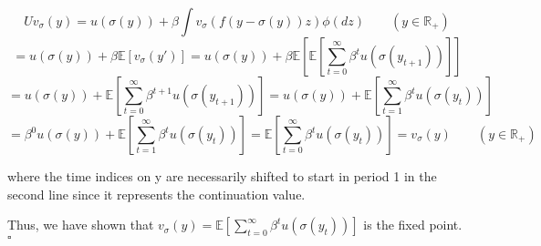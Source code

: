 \documentclass[letterpaper,12pt]{article}
\theoremstyle{definition}
\begin{document}
$$ Uv_{\sigma}(y) = u(\sigma(y)) + \beta \int v_{\sigma}(f(y - \sigma(y))z) \phi(dz) \qquad (y \in \mathbb R_+)$$
$$ = u(\sigma(y)) + \beta \mathbb{E} \left[ v_{\sigma}(y') \right]
= u(\sigma(y)) + \beta \mathbb{E} \left[ \mathbb E \left[ \sum_{t = 0}^{\infty} \beta^t u(\sigma(y_{t+1})) \right] \right]$$ 
$$ = u(\sigma(y)) + \mathbb E \left[ \sum_{t = 0}^{\infty} \beta^{t + 1} u(\sigma(y_{t+1})) \right] 
= u(\sigma(y)) + \mathbb E \left[ \sum_{t = 1}^{\infty} \beta^{t} u(\sigma(y_t)) \right] $$
$$ = \beta^0 u(\sigma(y)) + \mathbb E \left[ \sum_{t = 1}^{\infty} \beta^{t} u(\sigma(y_t)) \right] 
= \mathbb E \left[ \sum_{t = 0}^{\infty} \beta^t u(\sigma(y_t)) \right] =  v_{\sigma}(y)
\qquad (y \in \mathbb R_+)$$

where the time indices on y are necessarily shifted to start in period 1 in the second line since it represents the continuation value.

Thus, we have shown that $
v_{\sigma}(y) =
\mathbb E \left[ \sum_{t = 0}^{\infty} \beta^t u(\sigma(y_t)) \right]$ is the fixed point. $\square$

\vspace{25mm}


\end{document}
